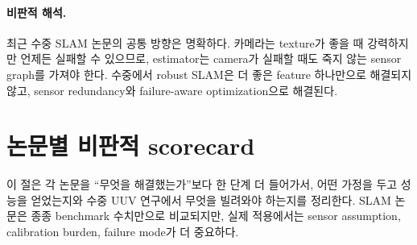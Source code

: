 \documentclass[11pt,a4paper]{article}
\begin{document}
\paragraph{비판적 해석.}
최근 수중 SLAM 논문의 공통 방향은 명확하다.
카메라는 texture가 좋을 때 강력하지만 언제든 실패할 수 있으므로, estimator는 camera가 실패할 때도 죽지 않는 sensor graph를 가져야 한다.
수중에서 robust SLAM은 더 좋은 feature 하나만으로 해결되지 않고, sensor redundancy와 failure-aware optimization으로 해결된다.

\section{논문별 비판적 scorecard}

이 절은 각 논문을 ``무엇을 해결했는가''보다 한 단계 더 들어가서, 어떤 가정을 두고 성능을 얻었는지와 수중 UUV 연구에서 무엇을 빌려와야 하는지를 정리한다.
SLAM 논문은 종종 benchmark 수치만으로 비교되지만, 실제 적용에서는 sensor assumption, calibration burden, failure mode가 더 중요하다.
\end{document}
